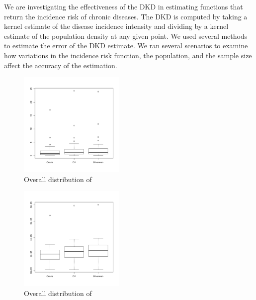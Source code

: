 

We are investigating the effectiveness of the DKD in estimating functions that return the incidence risk of chronic diseases. 
The DKD is computed by taking a kernel estimate of the disease incidence intensity and dividing by a kernel estimate of the population density at any given point.
We used several methods to estimate the error of the DKD estimate.
We ran several scenarios to examine how variations in the incidence risk function, the population, and the sample size affect the accuracy of the estimation. 


\begin{figure}[htbp]
  \centering
  \includegraphics[width=0.45\textwidth]{results/by_overall/normalized-mise-boxplot}
  \caption{Overall distribution of }
  \label{fig:discussion:overall_nmise_boxplot}
\end{figure}

\begin{figure}[htbp]
  \centering
  \includegraphics[width=0.45\textwidth]{results/by_overall/normalized-miae-boxplot}
  \caption{Overall distribution of }
  \label{fig:discussion:overall_nmiae_boxplot}
\end{figure}

